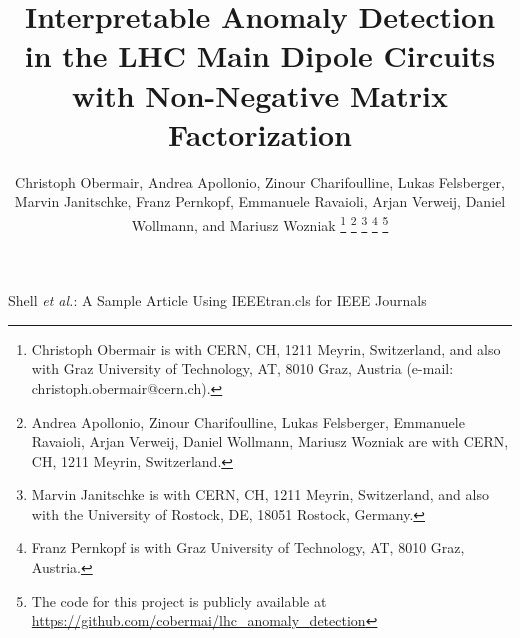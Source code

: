 \documentclass[lettersize,journal]{IEEEtran}
\begin{document}
\title{Interpretable Anomaly Detection in the LHC Main Dipole Circuits with Non-Negative Matrix Factorization}

\author{Christoph Obermair, Andrea Apollonio, Zinour Charifoulline, Lukas Felsberger, Marvin Janitschke, Franz Pernkopf, Emmanuele Ravaioli, Arjan Verweij, Daniel Wollmann, and Mariusz Wozniak %
\thanks{Christoph Obermair is with CERN, CH, 1211 Meyrin, Switzerland, and also with Graz University of Technology, AT, 8010 Graz, Austria (e-mail: christoph.obermair@cern.ch).}%
\thanks{Andrea Apollonio, Zinour Charifoulline, Lukas Felsberger, Emmanuele Ravaioli, Arjan Verweij, Daniel Wollmann, Mariusz Wozniak are with CERN, CH, 1211 Meyrin, Switzerland.}%
\thanks{Marvin Janitschke is with CERN, CH, 1211 Meyrin, Switzerland, and also with the University of Rostock, DE, 18051 Rostock, Germany.}%
\thanks{Franz Pernkopf is with Graz University of Technology, AT, 8010 Graz, Austria.}%
\thanks{The code for this project is publicly available at \url{https://github.com/cobermai/lhc_anomaly_detection}}%
}

%
{Shell \MakeLowercase{\textit{et al.}}: A Sample Article Using IEEEtran.cls for IEEE Journals}


\maketitle
\end{document}
